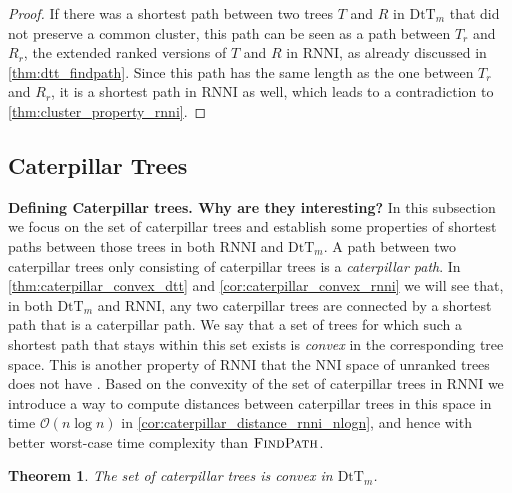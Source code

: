 \documentclass[11pt]{amsart}
\newtheorem{theorem}{Theorem}
\newcommand{\rnni}{\mathrm{RNNI}}
\newcommand{\findpath}{\textsc{FindPath}}
\newcommand{\nni}{\mathrm{NNI}}
\newcommand{\dtt}{\mathrm{DtT}}
\renewcommand{\O}{\mathcal O}
\newcommand{\summary}[1]{\textbf{#1}} %
\begin{document}
\begin{proof}
	If there was a shortest path between two trees $T$ and $R$ in $\dtt_m$ that did not preserve a common cluster, this path can be seen as a path between $T_r$ and $R_r$, the extended ranked versions of $T$ and $R$ in $\rnni$, as already discussed in \autoref{thm:dtt_findpath}.
	Since this path has the same length as the one between $T_r$ and $R_r$, it is a shortest path in $\rnni$ as well, which leads to a contradiction to \autoref{thm:cluster_property_rnni}.
\end{proof}

\subsection{Caterpillar Trees}

\summary{Defining Caterpillar trees. Why are they interesting?}
In this subsection we focus on the set of caterpillar trees and establish some properties of shortest paths between those trees in both $\rnni$ and $\dtt_m$.
A path between two caterpillar trees only consisting of caterpillar trees is a \emph{caterpillar path}.
In \autoref{thm:caterpillar_convex_dtt} and \autoref{cor:caterpillar_convex_rnni} we will see that, in both $\dtt_m$ and $\rnni$, any two caterpillar trees are connected by a shortest path that is a caterpillar path.
We say that a set of trees for which such a shortest path that stays within this set exists is \emph{convex} in the corresponding tree space.
This is another property of $\rnni$ that the $\nni$ space of unranked trees does not have \autocite{Gavryushkin2018-ol}.
Based on the convexity of the set of caterpillar trees in $\rnni$ we introduce a way to compute distances between caterpillar trees in this space in time $\O(n\log n)$ in \autoref{cor:caterpillar_distance_rnni_nlogn}, and hence with better worst-case time complexity than $\findpath$.

\begin{theorem}
	The set of caterpillar trees is convex in $\dtt_m$.
	\label{thm:caterpillar_convex_dtt}
\end{theorem}
\end{document}
